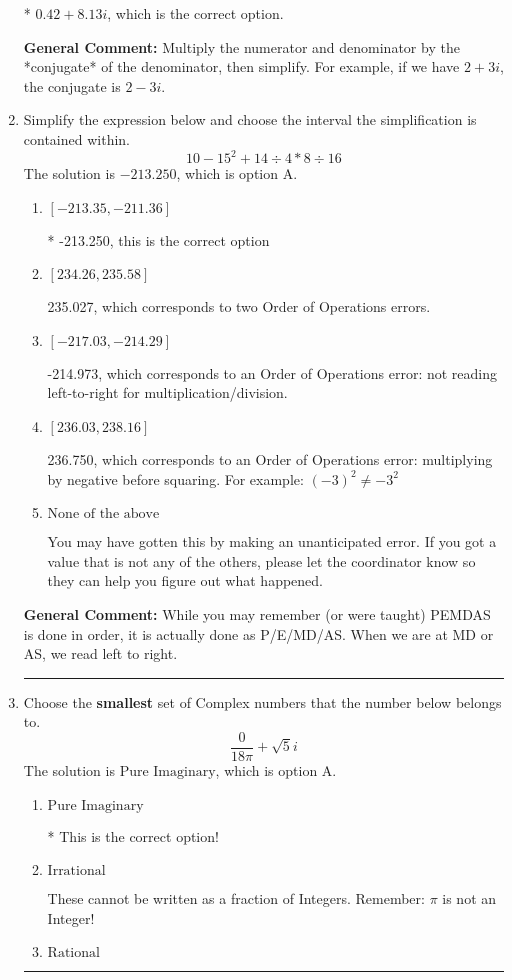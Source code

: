 \documentclass{extbook}[14pt]
\newcommand{\litem}[1]{\item #1

\rule{\textwidth}{0.4pt}}
\begin{document}
\begin{enumerate}
{\begin{enumerate}[label=\Alph*.]
* $0.42  + 8.13 i$, which is the correct option.
\end{enumerate}

\textbf{General Comment:} Multiply the numerator and denominator by the *conjugate* of the denominator, then simplify. For example, if we have $2+3i$, the conjugate is $2-3i$.
}
\litem{
Simplify the expression below and choose the interval the simplification is contained within.
\[ 10 - 15^2 + 14 \div 4 * 8 \div 16 \]
The solution is \( -213.250 \), which is option A.\begin{enumerate}[label=\Alph*.]
\item \( [-213.35, -211.36] \)

* -213.250, this is the correct option
\item \( [234.26, 235.58] \)

 235.027, which corresponds to two Order of Operations errors.
\item \( [-217.03, -214.29] \)

 -214.973, which corresponds to an Order of Operations error: not reading left-to-right for multiplication/division.
\item \( [236.03, 238.16] \)

 236.750, which corresponds to an Order of Operations error: multiplying by negative before squaring. For example: $(-3)^2 \neq -3^2$
\item \( \text{None of the above} \)

 You may have gotten this by making an unanticipated error. If you got a value that is not any of the others, please let the coordinator know so they can help you figure out what happened.
\end{enumerate}

\textbf{General Comment:} While you may remember (or were taught) PEMDAS is done in order, it is actually done as P/E/MD/AS. When we are at MD or AS, we read left to right.
}
\litem{
Choose the \textbf{smallest} set of Complex numbers that the number below belongs to.
\[ \frac{0}{18 \pi}+\sqrt{5}i \]
The solution is \( \text{Pure Imaginary} \), which is option A.\begin{enumerate}[label=\Alph*.]
\item \( \text{Pure Imaginary} \)

* This is the correct option!
\item \( \text{Irrational} \)

These cannot be written as a fraction of Integers. Remember: $\pi$ is not an Integer!
\item \( \text{Rational} \)


\end{enumerate}}
\end{enumerate}
\end{document}

